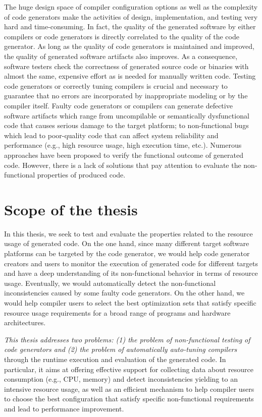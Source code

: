The huge design space of compiler configuration options as well as the complexity of code generators make the activities of design, implementation, and testing very hard and time-consuming\cite{guana2015developers}.
In fact, the quality of the generated software by either compilers or code generators is directly correlated to the quality of the code generator. As long as the quality of code generators is maintained and improved, the quality of generated software artifacts also improves.
As a consequence, software testers check the correctness of generated source code or binaries with almost the same, expensive effort as is needed for manually written code. 
Testing code generators or correctly tuning compilers is crucial and necessary to guarantee that no errors are incorporated by inappropriate modeling or by the compiler itself.
Faulty code generators or compilers can generate defective software artifacts which range from uncompilable or semantically dysfunctional code that causes serious damage to the target platform; to non-functional bugs which lead to poor-quality code that can affect system reliability and performance (e.g., high resource usage, high execution time, etc.). 
Numerous approaches have been proposed\cite{stuermer2007systematic,yang2011finding} to verify the functional outcome of generated code. However, there is a lack of solutions that pay attention to evaluate the non-functional properties of produced code.


\section{Scope of the thesis}

In this thesis, we seek to test and evaluate the properties related to the resource usage of generated code. 
On the one hand, since many different target software platforms can be targeted by the code generator, we would help code generator creators and users to monitor the execution of generated code for different targets and have a deep understanding of its non-functional behavior in terms of resource usage. Eventually, we would automatically detect the non-functional inconsistencies caused by some faulty code generators. 
On the other hand, we would help compiler users to select the best optimization sets that satisfy specific resource usage requirements for a broad range of programs and hardware architectures.

\textit{This thesis addresses two problems: (1) the problem of non-functional testing of code generators and (2) the problem of automatically auto-tuning compilers} through the runtime execution and evaluation of the generated code. 
In particular, it aims at offering effective support for collecting data about resource consumption (e.g., CPU, memory) and detect inconsistencies yielding to an intensive resource usage, as well as an efficient mechanism to help compiler users to choose the best configuration that satisfy specific non-functional requirements and lead to performance improvement.

